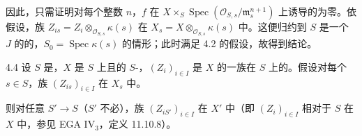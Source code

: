 因此，只需证明对每个整数 $n$，$f$ 在 $X\times_S\operatorname{Spec}(\mathcal O_{S,s}/\mathfrak m_s^{n+1})$ 上诱导的为零。依假设，族 $Z_{is}=Z_i\otimes_{\mathcal O_{S,s}}\kappa(s)$ 在 $X_s=X\otimes_{\mathcal O_{S,s}}\kappa(s)$ 中。这便归约到 $S$ 是一个 $J$ 的的，$S_0=\operatorname{Spec}\kappa(s)$ 的情形；此时满足 4.2 的假设，故得到结论。
\begin{SGAresult}{}{4.4}
设 $S$ 是，$X$ 是 $S$ 上且的 $S$-，$(Z_i)_{i\in I}$ 是 $X$ 的一族在 $S$ 上的。假设对每个 $s\in S$，族 $(Z_{is})_{i\in I}$ 在 $X_s$ 中。

则对任意 $S'\to S$（$S'$ 不必），族 $(Z_{iS'})_{i\in I}$ 在 $X'$ 中（即 $(Z_i)_{i\in I}$ 相对于 $S$ 在 $X$ 中，参见 EGA IV$_3$，定义 11.10.8）。
\end{SGAresult}
